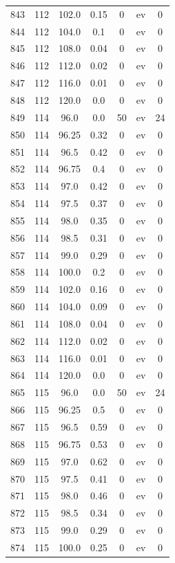 \documentclass[12pt,a4paper]{article}
\begin{document}
\begin{tabular}{r|cccccc}
	843 & 112 & 102.0 & 0.15 & 0 & ev & 0 \\
	844 & 112 & 104.0 & 0.1 & 0 & ev & 0 \\
	845 & 112 & 108.0 & 0.04 & 0 & ev & 0 \\
	846 & 112 & 112.0 & 0.02 & 0 & ev & 0 \\
	847 & 112 & 116.0 & 0.01 & 0 & ev & 0 \\
	848 & 112 & 120.0 & 0.0 & 0 & ev & 0 \\
	849 & 114 & 96.0 & 0.0 & 50 & ev & 24 \\
	850 & 114 & 96.25 & 0.32 & 0 & ev & 0 \\
	851 & 114 & 96.5 & 0.42 & 0 & ev & 0 \\
	852 & 114 & 96.75 & 0.4 & 0 & ev & 0 \\
	853 & 114 & 97.0 & 0.42 & 0 & ev & 0 \\
	854 & 114 & 97.5 & 0.37 & 0 & ev & 0 \\
	855 & 114 & 98.0 & 0.35 & 0 & ev & 0 \\
	856 & 114 & 98.5 & 0.31 & 0 & ev & 0 \\
	857 & 114 & 99.0 & 0.29 & 0 & ev & 0 \\
	858 & 114 & 100.0 & 0.2 & 0 & ev & 0 \\
	859 & 114 & 102.0 & 0.16 & 0 & ev & 0 \\
	860 & 114 & 104.0 & 0.09 & 0 & ev & 0 \\
	861 & 114 & 108.0 & 0.04 & 0 & ev & 0 \\
	862 & 114 & 112.0 & 0.02 & 0 & ev & 0 \\
	863 & 114 & 116.0 & 0.01 & 0 & ev & 0 \\
	864 & 114 & 120.0 & 0.0 & 0 & ev & 0 \\
	865 & 115 & 96.0 & 0.0 & 50 & ev & 24 \\
	866 & 115 & 96.25 & 0.5 & 0 & ev & 0 \\
	867 & 115 & 96.5 & 0.59 & 0 & ev & 0 \\
	868 & 115 & 96.75 & 0.53 & 0 & ev & 0 \\
	869 & 115 & 97.0 & 0.62 & 0 & ev & 0 \\
	870 & 115 & 97.5 & 0.41 & 0 & ev & 0 \\
	871 & 115 & 98.0 & 0.46 & 0 & ev & 0 \\
	872 & 115 & 98.5 & 0.34 & 0 & ev & 0 \\
	873 & 115 & 99.0 & 0.29 & 0 & ev & 0 \\
	874 & 115 & 100.0 & 0.25 & 0 & ev & 0 \\

\end{tabular}
\end{document}
